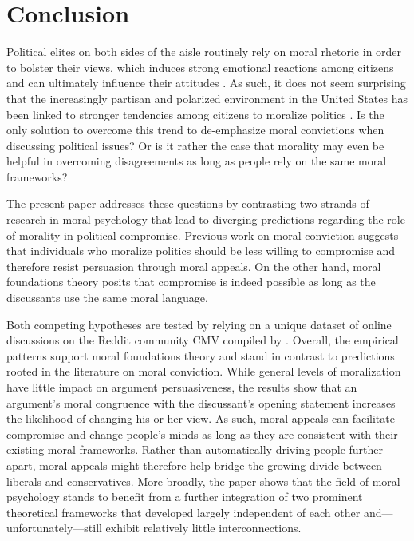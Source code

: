 


\section{Conclusion}\label{conclusion}

Political elites on both sides of the aisle routinely rely on moral rhetoric in order to bolster their views, which induces strong emotional reactions among citizens \citep{lipsitz2017playing} and can ultimately influence their attitudes \citep[e.g.,][]{clifford2013words,clifford2015concerns}. As such, it does not seem surprising that the increasingly partisan and polarized environment in the United States has been linked to stronger tendencies among citizens to moralize politics \citep{garrett2018moral}. Is the only solution to overcome this trend to de-emphasize moral convictions when discussing political issues? Or is it rather the case that morality may even be helpful in overcoming disagreements as long as people rely on the same moral frameworks?

The present paper addresses these questions by contrasting two strands of research in moral psychology that lead to diverging predictions regarding the role of morality in political compromise. Previous work on moral conviction suggests that individuals who moralize politics should be less willing to compromise and therefore resist persuasion through moral appeals. On the other hand, moral foundations theory posits that compromise is indeed possible as long as the discussants use the same moral language.

Both competing hypotheses are tested by relying on a unique dataset of online discussions on the Reddit community CMV compiled by \cite{tan2016winning}. Overall, the empirical patterns support moral foundations theory and stand in contrast to predictions rooted in the literature on moral conviction. While general levels of moralization have little impact on argument persuasiveness, the results show that an argument's moral congruence with the discussant's opening statement increases the likelihood of changing his or her view. As such, moral appeals can facilitate compromise and change people's minds as long as they are consistent with their existing moral frameworks. Rather than automatically driving people further apart, moral appeals might therefore help bridge the growing divide between liberals and conservatives. More broadly, the paper shows that the field of moral psychology stands to benefit from a further integration of two prominent theoretical frameworks that developed largely independent of each other and---unfortunately---still exhibit relatively little interconnections.

